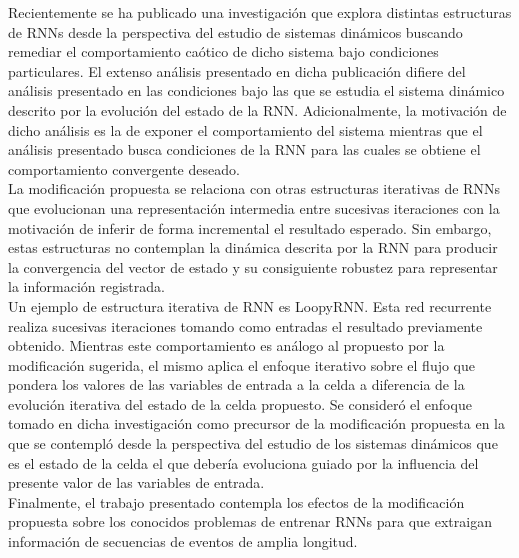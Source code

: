 \documentclass{article}
\begin{document}
	Recientemente se ha publicado una investigación\cite{11Laurent} que explora distintas estructuras de RNNs desde la perspectiva del estudio de sistemas dinámicos buscando remediar el comportamiento caótico de dicho sistema bajo condiciones particulares. El extenso análisis presentado en dicha publicación difiere del análisis presentado en las condiciones bajo las que se estudia el sistema dinámico descrito por la evolución del estado de la RNN. Adicionalmente, la motivación de dicho análisis es la de exponer el comportamiento del sistema mientras que el análisis presentado busca condiciones de la RNN para las cuales se obtiene el comportamiento convergente deseado.\\
	
	La modificación propuesta se relaciona con otras estructuras iterativas\cite{2BridgingGaps} de RNNs que evolucionan una representación intermedia entre sucesivas iteraciones con la motivación de inferir de forma incremental el resultado esperado. Sin embargo, estas estructuras no contemplan la dinámica descrita por la RNN para producir la convergencia del vector de estado y su consiguiente robustez para representar la información registrada.\\
	
	Un ejemplo de estructura iterativa de RNN es LoopyRNN\cite{17LoopyRNN}. Esta red recurrente realiza sucesivas iteraciones tomando como entradas el resultado previamente obtenido. Mientras este comportamiento es análogo al propuesto por la modificación sugerida, el mismo aplica el enfoque iterativo sobre el flujo que pondera los valores de las variables de entrada a la celda a diferencia de la evolución iterativa del estado de la celda propuesto. Se consideró el enfoque tomado en dicha investigación como precursor de la modificación propuesta en la que se contempló desde la perspectiva del estudio de los sistemas dinámicos que es el estado de la celda el que debería evoluciona guiado por la influencia del presente valor de las variables de entrada.\\
	Finalmente, el trabajo presentado contempla los efectos de la modificación propuesta sobre los conocidos problemas de entrenar RNNs para que extraigan información de secuencias de eventos de amplia longitud.
	
\end{document}
